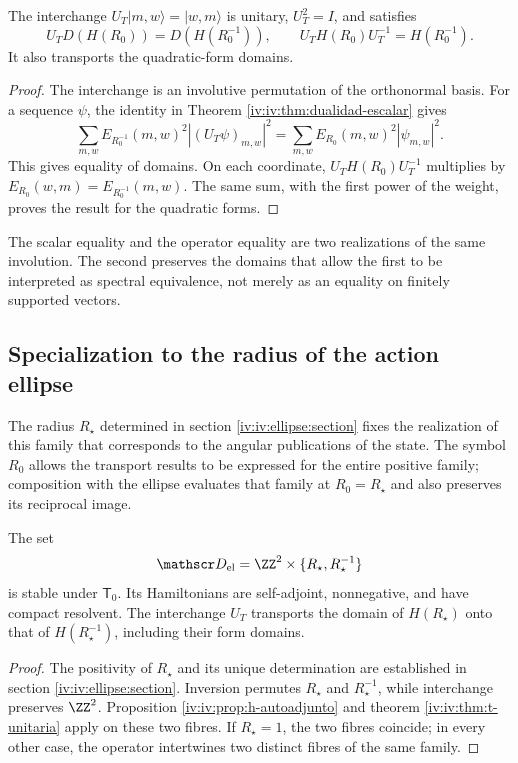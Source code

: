 \begin{theorem}
\label{iv:iv:thm:t-unitaria}
\label{iv:prop:dualidad-radios-k}
The interchange
\(U_T|m,w\rangle=|w,m\rangle\) is unitary,
\(U_T^2=I\), and satisfies
\begin{equation}
 U_TD(H(R_0))=D(H(R_0^{-1})),
 \qquad U_TH(R_0)U_T^{-1}=H(R_0^{-1}).
 \label{iv:iv:eq:conjugacion-h}
\end{equation}
It also transports the quadratic-form domains.
\end{theorem}
\begin{proof}
The interchange is an involutive permutation of the
orthonormal basis. For a sequence \(\psi\), the identity in
Theorem \ref{iv:iv:thm:dualidad-escalar} gives
\[
 \sum_{m,w}E_{R_0^{-1}}(m,w)^2|(U_T\psi)_{m,w}|^2
 =\sum_{m,w}E_{R_0}(m,w)^2|\psi_{m,w}|^2.
\]
This gives equality of domains. On each coordinate,
\(U_TH(R_0)U_T^{-1}\) multiplies by
\(E_{R_0}(w,m)=E_{R_0^{-1}}(m,w)\). The same sum, with
the first power of the weight, proves the result for the
quadratic forms.
\end{proof}

The scalar equality and the operator equality are two realizations
of the same involution. The second preserves the domains that
allow the first to be interpreted as spectral equivalence,
not merely as an equality on finitely supported vectors.

\subsection{Specialization to the radius of the action ellipse}

The radius \(R_\star\) determined in section
\ref{iv:iv:ellipse:section} fixes the realization of this family that
corresponds to the angular publications of the state. The symbol
\(R_0\) allows the transport results to be expressed for the entire
positive family; composition with the ellipse evaluates that family at
\(R_0=R_\star\) and also preserves its reciprocal image.

\begin{corollary}
\label{iv:iv:cor:radio-especializado}
The set
\[
 \mathscr D_{\mathrm{el}}
 =\ZZ^2\times\{R_\star,R_\star^{-1}\}
\]
is stable under \(\mathsf T_0\). Its Hamiltonians are self-adjoint,
nonnegative, and have compact resolvent. The interchange \(U_T\)
transports the domain of \(H(R_\star)\) onto that of
\(H(R_\star^{-1})\), including their form domains.
\end{corollary}
\begin{proof}
The positivity of \(R_\star\) and its unique determination are established
in section \ref{iv:iv:ellipse:section}. Inversion permutes
\(R_\star\) and \(R_\star^{-1}\), while interchange preserves
\(\ZZ^2\). Proposition
\ref{iv:iv:prop:h-autoadjunto} and theorem \ref{iv:iv:thm:t-unitaria} apply on these two fibres.
If \(R_\star=1\), the two fibres coincide; in every other case,
the operator intertwines two distinct fibres of the same family.
\end{proof}

